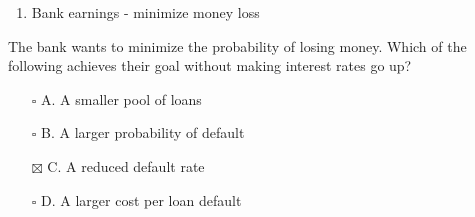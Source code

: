 \documentclass[
]{article}
\providecommand{\tightlist}{%
  \setlength{\itemsep}{0pt}\setlength{\parskip}{0pt}}
\begin{document}
\begin{enumerate}
\def\labelenumi{\arabic{enumi}.}
\setcounter{enumi}{6}
\tightlist
\item
  Bank earnings - minimize money loss
\end{enumerate}

The bank wants to minimize the probability of losing money. Which of the
following achieves their goal without making interest rates go up?

\begin{itemize}
\tightlist
\item[$\square$]
  A. A smaller pool of loans
\item[$\square$]
  B. A larger probability of default
\item[$\boxtimes$]
  C. A reduced default rate
\item[$\square$]
  D. A larger cost per loan default
\end{itemize}
\end{document}
